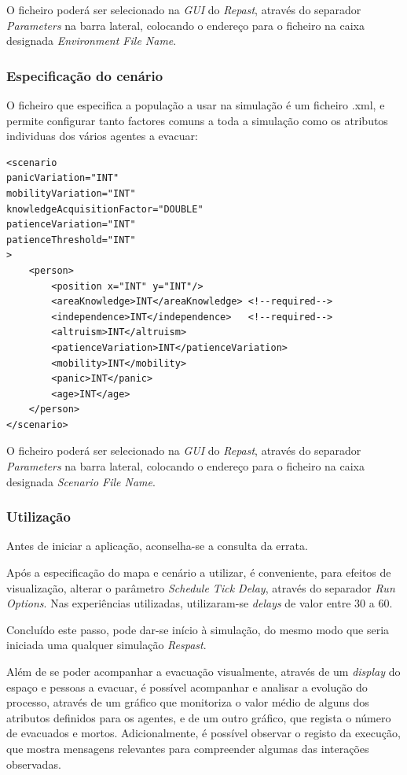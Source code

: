 \documentclass[12pt]{article}
\begin{document}
\begin{titlepage}
O ficheiro poderá ser selecionado na \textit{GUI} do \textit{Repast}, através do separador \textit{Parameters} na barra lateral, colocando o endereço para o ficheiro na caixa designada \textit{Environment File Name}.

\subsubsection{Especificação do cenário}

O ficheiro que especifica a população a usar na simulação é um ficheiro .xml, e permite configurar tanto factores comuns a toda a simulação como os atributos individuas dos vários agentes a evacuar:
\begin{lstlisting}
<scenario 
panicVariation="INT"
mobilityVariation="INT"
knowledgeAcquisitionFactor="DOUBLE"
patienceVariation="INT"
patienceThreshold="INT"
>
	<person>
		<position x="INT" y="INT"/>
		<areaKnowledge>INT</areaKnowledge> <!--required-->
		<independence>INT</independence>   <!--required-->
		<altruism>INT</altruism>
		<patienceVariation>INT</patienceVariation>
		<mobility>INT</mobility>
		<panic>INT</panic>
		<age>INT</age>
	</person>
</scenario>
\end{lstlisting}

O ficheiro poderá ser selecionado na \textit{GUI} do \textit{Repast}, através do separador \textit{Parameters} na barra lateral, colocando o endereço para o ficheiro na caixa designada \textit{Scenario File Name}.

\subsubsection{Utilização}

Antes de iniciar a aplicação, aconselha-se a consulta da errata.

Após a especificação do mapa e cenário a utilizar, é conveniente, para efeitos de visualização, alterar o parâmetro \textit{Schedule Tick Delay}, através do separador \textit{Run Options}. Nas experiências utilizadas, utilizaram-se \textit{delays} de valor entre 30 a 60.

Concluído este passo, pode dar-se início à simulação, do mesmo modo que seria iniciada uma qualquer simulação \textit{Respast}.

Além de se poder acompanhar a evacuação visualmente, através de um \textit{display} do espaço e pessoas a evacuar, é possível acompanhar e analisar a evolução do processo, através de um gráfico que monitoriza o valor médio de alguns dos atributos definidos para os agentes, e de um outro gráfico, que regista o número de evacuados e mortos. Adicionalmente, é possível observar o registo da execução, que mostra mensagens relevantes para compreender algumas das interações observadas.


\end{titlepage}
\end{document}
